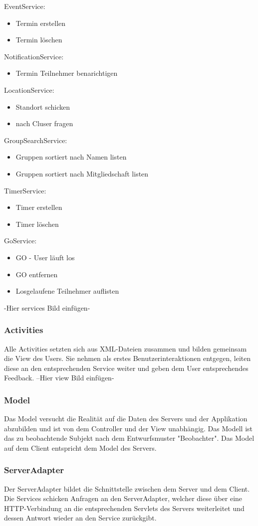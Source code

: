 EventService:
\begin{itemize}
\item Termin erstellen
\item Termin löschen
\end{itemize}
NotificationService:
\begin{itemize}
\item Termin Teilnehmer benarichtigen
\end{itemize}
LocationService:
\begin{itemize}
\item Standort schicken
\item nach Cluser fragen
\end{itemize}
GroupSearchService:
\begin{itemize}
\item Gruppen sortiert nach Namen listen
\item Gruppen sortiert nach Mitgliedschaft listen
\end{itemize}
TimerService:
\begin{itemize}
\item Timer erstellen
\item Timer löschen
\end{itemize}
GoService:
\begin{itemize}
\item GO - User läuft los
\item GO entfernen
\item Losgelaufene Teilnehmer auflisten
\end{itemize}
-Hier services Bild einfügen-

	\subsubsection{Activities}
	Alle Activities setzten sich aus XML-Dateien zusammen und bilden gemeinsam die View des Users.
Sie nehmen als erstes Benutzerinteraktionen entgegen, leiten diese an den entsprechenden Service weiter und geben dem User entsprechendes Feedback.
	--Hier view Bild einfügen-
	\subsubsection{Model}
Das Model versucht die Realität auf die Daten des Servers und der Applikation abzubilden und ist von dem Controller und der View unabhängig. Das Modell ist das zu beobachtende Subjekt nach dem Entwurfsmuster "Beobachter".
Das Model auf dem Client entspricht dem Model des Servers.
	\subsubsection{ServerAdapter}
	Der ServerAdapter bildet die Schnittstelle zwischen dem Server und dem Client. Die Services schicken Anfragen an den ServerAdapter, welcher diese über eine HTTP-Verbindung an die entsprechenden Servlets des Servers weiterleitet und dessen Antwort wieder an den Service zurückgibt.


	\newpage